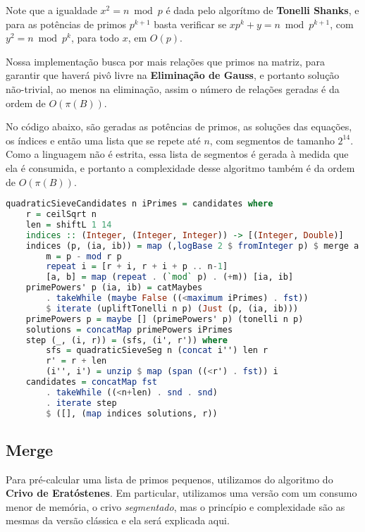 \documentclass{article}
\begin{document}
Note que a igualdade $x^2 = n \bmod p$ é dada pelo algorítmo de \textbf{Tonelli Shanks}, e para as potências de primos $p^{k+1}$ basta verificar se $x p^k + y = n \bmod p^{k+1}$, com $y^2 = n \bmod p^k$, para todo $x$, em $O(p)$.

Nossa implementação busca por mais relações que primos na matriz, para garantir que haverá pivô livre na \textbf{Eliminação de Gauss}, e portanto solução não-trivial, ao menos na eliminação, assim o número de relações geradas é da ordem de $O(\pi(B))$.

No código abaixo, são geradas as potências de primos, as soluções das equações, os índices e então uma lista que se repete até $n$, com segmentos de tamanho $2^{14}$. Como a linguagem não é estrita, essa lista de segmentos é gerada à medida que ela é consumida, e portanto a complexidade desse algoritmo também é da ordem de $O(\pi(B))$.

\begin{minipage}{0.9\linewidth}
\begin{lstlisting}[language=haskell,caption=Crivo Quadrático - Candidatos]
quadraticSieveCandidates n iPrimes = candidates where
    r = ceilSqrt n
    len = shiftL 1 14
    indices :: (Integer, (Integer, Integer)) -> [(Integer, Double)]
    indices (p, (ia, ib)) = map (,logBase 2 $ fromInteger p) $ merge a b where
        m = p - mod r p
        repeat i = [r + i, r + i + p .. n-1]
        [a, b] = map (repeat . (`mod` p) . (+m)) [ia, ib]
    primePowers' p (ia, ib) = catMaybes
        . takeWhile (maybe False ((<maximum iPrimes) . fst))
        $ iterate (upliftTonelli n p) (Just (p, (ia, ib)))
    primePowers p = maybe [] (primePowers' p) (tonelli n p)
    solutions = concatMap primePowers iPrimes
    step (_, (i, r)) = (sfs, (i', r')) where
        sfs = quadraticSieveSeg n (concat i'') len r
        r' = r + len
        (i'', i') = unzip $ map (span ((<r') . fst)) i
    candidates = concatMap fst
        . takeWhile ((<n+len) . snd . snd)
        . iterate step
        $ ([], (map indices solutions, r))
\end{lstlisting}
\end{minipage}


\subsection{Merge}
\label{merge}

Para pré-calcular uma lista de primos pequenos, utilizamos do algoritmo do \textbf{Crivo de Eratóstenes}. Em particular, utilizamos uma versão com um consumo menor de memória, o crivo \textit{segmentado}, mas o princípio e complexidade são as mesmas da versão clássica e ela será explicada aqui.
\end{document}

